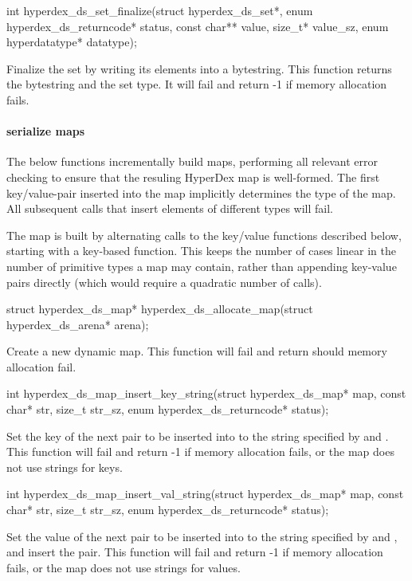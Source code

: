 \begin{ccode}
int hyperdex_ds_set_finalize(struct hyperdex_ds_set*,
                             enum hyperdex_ds_returncode* status,
                             const char** value, size_t* value_sz,
                             enum hyperdatatype* datatype);
\end{ccode}
Finalize the set by writing its elements into a bytestring.  This
function returns the bytestring and the set type.  It will fail and return -1 if
memory allocation fails.

\paragraph{serialize maps}

The below functions incrementally build maps, performing all relevant error
checking to ensure that the resuling HyperDex map is well-formed.  The first
key/value-pair inserted into the map implicitly determines the type of the map.  All
subsequent calls that insert elements of different types will fail.

The map is built by alternating calls to the key/value functions described
below, starting with a key-based function.  This keeps the number of cases
linear in the number of primitive types a map may contain, rather than appending
key-value pairs directly (which would require a quadratic number of calls).

\begin{ccode}
struct hyperdex_ds_map* hyperdex_ds_allocate_map(struct hyperdex_ds_arena* arena);
\end{ccode}
Create a new dynamic map.  This function will fail and return
 should memory allocation fail.

\begin{ccode}
int hyperdex_ds_map_insert_key_string(struct hyperdex_ds_map* map,
                                      const char* str, size_t str_sz,
                                      enum hyperdex_ds_returncode* status);
\end{ccode}
Set the key of the next pair to be inserted into  to the
string specified by  and .  This function will fail and
return -1 if memory allocation fails, or the map does not use strings for keys.

\begin{ccode}
int hyperdex_ds_map_insert_val_string(struct hyperdex_ds_map* map,
                                      const char* str, size_t str_sz,
                                      enum hyperdex_ds_returncode* status);
\end{ccode}
Set the value of the next pair to be inserted into  to the
string specified by  and , and insert the pair.  This
function will fail and return -1 if memory allocation fails, or the map does not
use strings for values.


